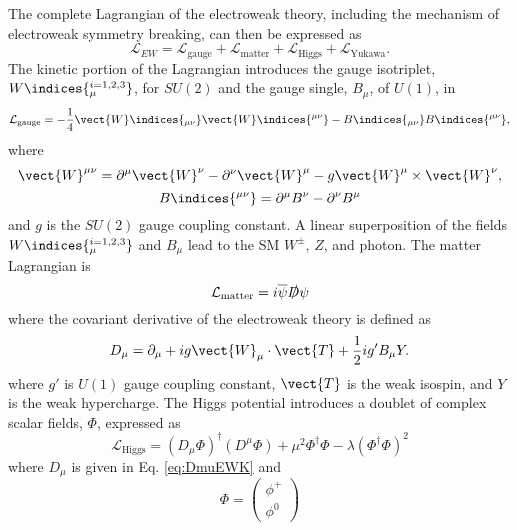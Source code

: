 The complete Lagrangian of the electroweak theory, including the mechanism 
of electroweak symmetry breaking, can then be expressed as
\begin{equation}
\mathcal{L}_{EW} = \mathcal{L}_\text{gauge} + \mathcal{L}_\text{matter} + \mathcal{L}_\text{Higgs} +   \mathcal{L}_\text{Yukawa}  .
\end{equation}
The kinetic portion of the Lagrangian introduces the gauge isotriplet, $W\indices{_{\mu}^{i=1,2,3}}$, for 
 $ SU\left(2\right) $ and the gauge single, $B_\mu$, of $ U\left(1\right) $, in
\begin{equation}
\mathcal{L}_\text{gauge} =  -\frac{1}{4} \vect{W}\indices{_{\mu\nu}}\vect{W}\indices{^{\mu\nu}} - B\indices{_{\mu\nu}}B\indices{^{\mu\nu}},
\end{equation}
where 
\begin{equation}
\vect{W}^{\mu\nu} = \partial^{\mu}\vect{W}^{\nu} - \partial^{\nu} \vect{W}^{\mu} - g \vect{W}^{\mu} \times \vect{W}^{\nu},
\end{equation}
\begin{equation}
B\indices{^{\mu\nu}} = \partial^{\mu} B^{\nu} - \partial^{\nu} B^{\mu}
\end{equation}
and $g$ is the $ SU\left(2\right) $ gauge coupling constant. A linear superposition of the 
fields  $W\indices{_{\mu}^{i=1,2,3}}$ and $B_\mu$ lead to the SM $W^{\pm}$, $Z$, and photon.
The matter Lagrangian is
\begin{equation}
\mathcal{L}_\text{matter} = i\overline{\psi}\slashed{D}\psi
\end{equation}
where the covariant derivative of the electroweak theory is defined as
\begin{equation}
\label{eq:DmuEWK}
D_{\mu} = \partial_\mu + i g \vect{W}_\mu \cdot \vect{T} + \frac{1}{2}i g' B_{\mu}Y.
\end{equation}
where $g'$ is  $ U\left(1\right) $ gauge coupling constant, $\vect{T}$ is the weak isospin, and $Y$ is the weak hypercharge.
The Higgs potential introduces a doublet of complex scalar fields, $\Phi$, expressed as
\begin{equation}
 \mathcal{L}_\text{Higgs} = \left(D_\mu\Phi\right)^{\dagger} \left(D^\mu\Phi\right) + \mu^2 \Phi^{\dagger} \Phi - \lambda  \left(\Phi^{\dagger} \Phi \right)^2
\end{equation}
where $D_\mu$ is given in Eq. \ref{eq:DmuEWK} and 
\begin{equation}
\Phi = \left( \begin{matrix} \phi^+ \\ \phi^0\end{matrix} \right)
\end{equation}

